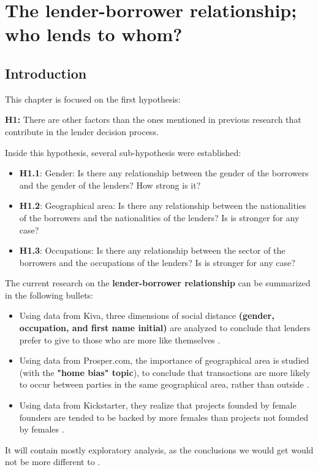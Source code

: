 \chapter{The lender-borrower relationship; who lends to whom?} %

\label{Chapter3} %

\section{Introduction}
This chapter is focused on the first hypothesis:
\begin{tcolorbox}
\textbf{H1:} There are other factors than the ones mentioned in previous research that contribute in the lender decision process.
\end{tcolorbox}

Inside this hypothesis, several sub-hypothesis were established:
\begin{itemize}
\item \textbf{H1.1}: Gender: Is there any relationship between the gender of the borrowers and the gender of the lenders? How strong is it?
\item \textbf{H1.2}: Geographical area: Is there any relationship between the nationalities of the borrowers and the nationalities of the lenders? Is is stronger for any case?
\item \textbf{H1.3}: Occupations: Is there any relationship between the sector of the borrowers and the occupations of the lenders? Is is stronger for any case?
\end{itemize}


The current research on the \textbf{lender-borrower relationship} can be summarized in the following bullets:
\begin{itemize}
\item Using data from Kiva, three dimensions of social distance \textbf{(gender, occupation, and first name initial)} are analyzed to conclude that lenders prefer to give to those who are more like themselves \textcite{Galak2010}.
\item Using data from Prosper.com, the importance of geographical area is studied (with the \textbf{"home bias" topic}), to conclude that transactions are more likely to occur between parties in the same geographical area, rather than outside \textcite{Lin2013}. 
\item Using data from Kickstarter, they realize that projects founded by female founders are tended to be backed by more females than projects not founded by females \textcite{Greenberg2015}.
\end{itemize}
It will contain mostly exploratory analysis, as the conclusions we would get would not be more different to \textcite{Galak2010}. 

